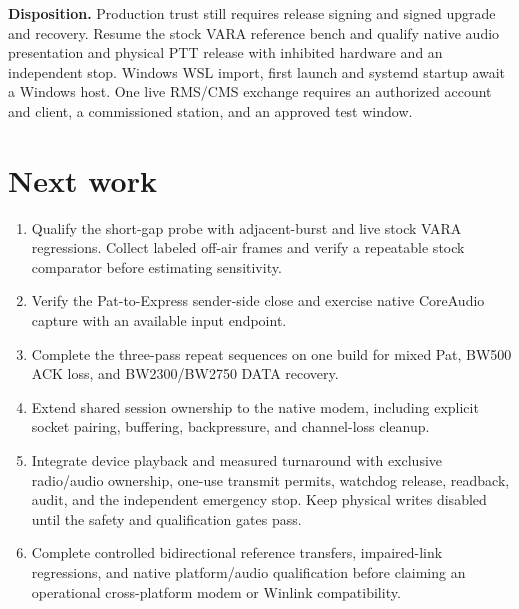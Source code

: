 \documentclass[11pt,a4paper]{article}
\begin{document}
\textbf{Disposition.} Production trust still requires release signing and
signed upgrade and recovery. Resume the stock VARA reference bench and
qualify native audio presentation and physical PTT release with inhibited
hardware and an independent stop. Windows WSL import, first launch and
systemd startup await a Windows host. One live RMS/CMS exchange requires
an authorized account and client, a commissioned station, and an approved
test window.

\clearpage
\section{Next work}

\begin{enumerate}[leftmargin=*]
  \item Qualify the short-gap probe with adjacent-burst and live stock
        VARA regressions. Collect labeled off-air frames and verify a
        repeatable stock comparator before estimating sensitivity.
  \item Verify the Pat-to-Express sender-side close and exercise
        native CoreAudio capture with an available input endpoint.
  \item Complete the three-pass repeat sequences on one build for mixed Pat,
        BW500 ACK loss, and BW2300/BW2750 DATA recovery.
  \item Extend shared session ownership to the native modem, including
        explicit socket pairing, buffering, backpressure, and channel-loss
        cleanup.
  \item Integrate device playback and measured turnaround with exclusive
        radio/audio ownership, one-use transmit permits, watchdog release,
        readback, audit, and the independent emergency stop. Keep physical
        writes disabled until the safety and qualification gates pass.
  \item Complete controlled bidirectional reference transfers, impaired-link
        regressions, and native platform/audio qualification before claiming
        an operational cross-platform modem or Winlink compatibility.
\end{enumerate}

\clearpage
\end{document}
